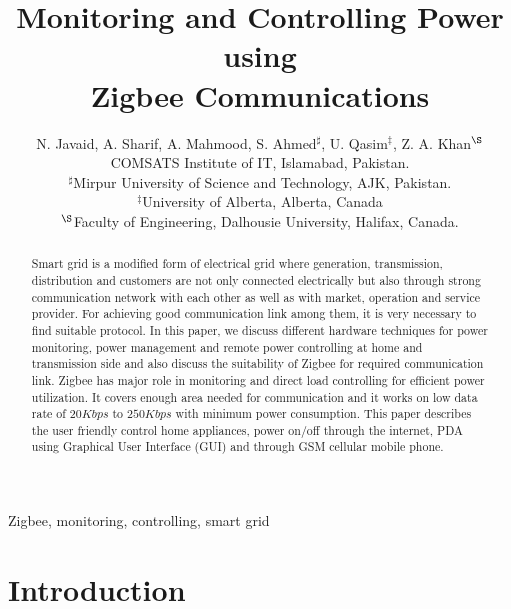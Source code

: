\documentclass[10pt, conference, compsocconf]{IEEEtran}
\begin{document}
\title{Monitoring and Controlling Power using\\ Zigbee Communications}


\author{N. Javaid, A. Sharif, A. Mahmood, S. Ahmed$^\sharp$, U. Qasim$^{\ddag}$, Z. A. Khan$^{\S}$\\

        COMSATS Institute of IT, Islamabad, Pakistan. \\
        $^\sharp$Mirpur University of Science and Technology, AJK, Pakistan.\\
        $^{\ddag}$University of Alberta, Alberta, Canada\\
        $^{\S}$Faculty of Engineering, Dalhousie University, Halifax, Canada.
        }

\maketitle


\begin{abstract}
Smart grid is a modified form of electrical grid where generation, transmission, distribution and customers are not only connected electrically but also through strong communication network with each other as well as with market, operation and service provider. For achieving good communication link among them, it is very necessary to find suitable protocol. In this paper, we discuss different hardware techniques for power monitoring, power management and remote power controlling at home and transmission side and also discuss the suitability of Zigbee for required communication link. Zigbee has major role in monitoring and direct load controlling for efficient power utilization. It covers enough area needed for communication and it works on low data rate of $20 Kbps$ to $250 Kbps$ with minimum power consumption. This paper describes the user friendly control home appliances, power on/off through the internet, PDA using Graphical User Interface (GUI) and through GSM cellular mobile phone.

 \end{abstract}

\begin{IEEEkeywords}
Zigbee, monitoring, controlling, smart grid
\end{IEEEkeywords}

\IEEEpeerreviewmaketitle
\section{Introduction}
\end{document}
